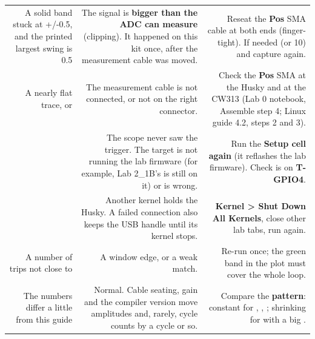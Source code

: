 \documentclass[11pt,letterpaper]{article}
\begin{document}

{\small{}
\begin{longtable}{|R{0.2754}|R{0.3913}|R{0.3333}|}
\hline
{} &  &  \\ \hline
\endhead
A solid band stuck at +/-0.5, and the printed largest swing is 0.5 & The signal is \textbf{bigger than the ADC can measure} (clipping). It happened on this kit once, after the measurement cable was moved. & Reseat the \textbf{Pos} SMA cable at both ends (finger-tight). If needed  (or 10) and capture again. \\ \hline
A nearly flat trace, or  & The measurement cable is not connected, or not on the right connector. & Check the \textbf{Pos} SMA at the Husky and at the CW313 (Lab 0 notebook, Assemble step 4; Linux guide 4.2, steps 2 and 3). \\ \hline
{} & The scope never saw the trigger. The target is not running the lab firmware (for example, Lab 2\_1B's  is still on it) or  is wrong. & Run the \textbf{Setup cell again} (it reflashes the lab firmware). Check  is on \textbf{T-GPIO4}. \\ \hline
{} & Another kernel holds the Husky. A failed connection also keeps the USB handle until its kernel stops. & \textbf{Kernel \textgreater{} Shut Down All Kernels}, close other lab tabs, run again. \\ \hline
A number of trips not close to  & A window edge, or a weak match. & Re-run once; the green band in the plot must cover the whole loop. \\ \hline
The numbers differ a little from this guide & Normal. Cable seating, gain and the compiler version move amplitudes and, rarely, cycle counts by a cycle or so. & Compare the \textbf{pattern}: constant for \codesmall{*}, \codesmall{+}, \codesmall{\textasciicircum{}}; shrinking for \codesmall{/} with a big . \\ \hline
\end{longtable}}

\vspace{4pt}

\end{document}
